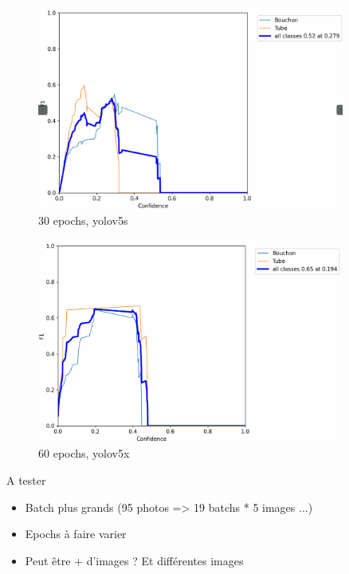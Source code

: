 \documentclass[12pt]{beamer}
\begin{document}
\begin{frame}[allowframebreaks]
	    
	    \begin{figure}
		    \centering
		    \includegraphics[width=0.9\textwidth]{image/curve13.png}
		    \caption*{30 epochs, yolov5s}
	    \end{figure}
	    
	    \begin{figure}
		    \centering
		    \includegraphics[width=0.9\textwidth]{image/curve10.png}
		    \caption*{60 epochs, yolov5x}
	    \end{figure}
	\end{frame}
	\begin{frame}[allowframebreaks]
	    \begin{alertblock}{A tester}
	        \begin{itemize}
	            [triangle]
	            \item Batch plus grands (95 photos => 19 batchs * 5 images ...)
	            \item Epochs à faire varier
	            \item Peut être + d'images ? Et différentes images
	        \end{itemize}
	    \end{alertblock}
	\end{frame}
\end{document}
